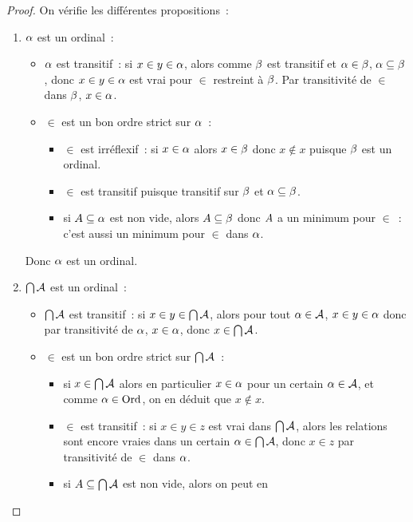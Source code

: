 \begin{proof}
  On vérifie les différentes propositions~:
  \begin{enumerate}
  \item $\alpha$ est un ordinal~:
    \begin{itemize}
    \item $\alpha$ est transitif~: si $x\in y \in \alpha$, alors comme
      $\beta$ est transitif et $\alpha \in \beta$, $\alpha\subseteq \beta$,
      donc $x \in y \in \alpha$ est vrai pour $\in$ restreint à $\beta$. Par
      transitivité de $\in$ dans $\beta$, $x\in\alpha$.
    \item $\in$ est un bon ordre strict sur $\alpha$~:
      \begin{itemize}
      \item $\in$ est irréflexif~: si $x\in \alpha$ alors $x\in \beta$ donc
        $x\notin x$ puisque $\beta$ est un ordinal.
      \item $\in$ est transitif puisque transitif sur $\beta$ et
        $\alpha\subseteq\beta$.
      \item si $A\subseteq \alpha$ est non vide, alors
        $A\subseteq \beta$ donc $A$ a un minimum pour $\in$~: c'est
        aussi un minimum pour $\in$ dans $\alpha$.
      \end{itemize}
    \end{itemize}
    Donc $\alpha$ est un ordinal.
  \item $\bigcap \mathcal A$ est un ordinal~:
    \begin{itemize}
    \item $\bigcap \mathcal A$ est transitif~: si $x\in y \in \bigcap \mathcal A$,
      alors pour tout $\alpha \in \mathcal A$, $x \in y \in \alpha$ donc par
      transitivité de $\alpha$, $x \in \alpha$, donc $x\in \bigcap \mathcal A$.
    \item $\in$ est un bon ordre strict sur $\bigcap \mathcal A$~:
      \begin{itemize}
      \item si $x \in \bigcap \mathcal A$ alors en particulier $x\in \alpha$ pour
        un certain $\alpha \in \mathcal A$, et comme $\alpha \in \operatorname{Ord}$, on en
        déduit que $x\notin x$.
      \item $\in$ est transitif~: si $x\in y \in z$ est vrai dans
        $\bigcap \mathcal A$, alors les relations sont encore vraies dans un
        certain $\alpha \in \bigcap \mathcal A$, donc $x \in z$ par transitivité de
        $\in$ dans $\alpha$.
      \item si $A\subseteq \bigcap \mathcal A$ est non vide, alors on peut en

\end{itemize}
\end{itemize}
\end{enumerate}
\end{proof}
